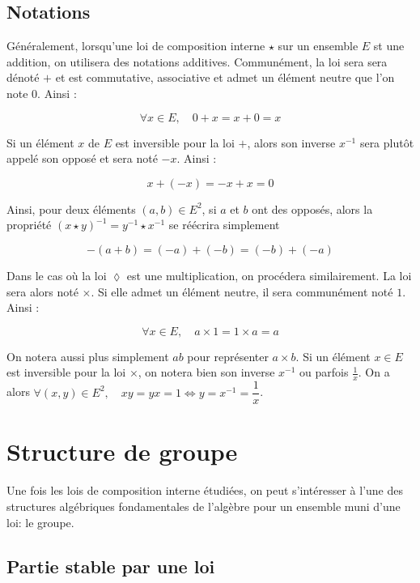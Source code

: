 \documentclass[a4paper,french,bookmarks]{article}
\begin{document}
\subsection{Notations}

Généralement, lorsqu'une loi de composition interne $\star$ sur un ensemble $E$ st une addition, on utilisera des notations additives. Communément, la loi sera sera dénoté $+$ et est commutative, associative et admet un élément neutre que l'on note $0$. Ainsi :

\[ \forall x \in E, \quad 0 + x = x + 0 = x\]

Si un élément $x$ de $E$ est inversible pour la loi $+$, alors son inverse $x^{-1}$ sera plutôt appelé son opposé et sera noté $-x$. Ainsi :

\[ x + (-x) = -x + x = 0\]

Ainsi, pour deux éléments $(a, b) \in E^2$, si $a$ et $b$ ont des opposés, alors la propriété $(x \star y)^{-1} = y^{-1} \star x^{-1}$ se réécrira simplement

\[ -(a + b) = (-a) + (-b) = (-b) + (-a)\]

Dans le cas où la loi $\lozenge$ est une multiplication, on procédera similairement. La loi sera alors noté $\times$. Si elle admet un élément neutre, il sera communément noté $1$. Ainsi :

\[ \forall x \in E,\quad a \times 1 = 1 \times a = a\]

On notera aussi plus simplement $ab$ pour représenter $a \times b$. Si un élément $x \in E$ est inversible pour la loi $\times$, on notera bien son inverse $x^{-1}$ ou parfois $\frac{1}{x}$. On a alors
$\forall (x,y) \in E^2,\quad xy = yx = 1 \iff y = x^{-1} = \dfrac{1}{x}$.

\newpage

\section{Structure de groupe}

\qquad Une fois les lois de composition interne étudiées, on peut s'intéresser à l'une des structures algébriques fondamentales de l'algèbre pour un ensemble muni d'une loi: le groupe.

\subsection{Partie stable par une loi}
\end{document}
